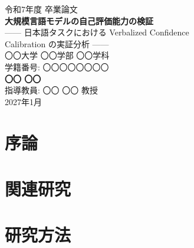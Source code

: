 \documentclass[12pt,a4paper,titlepage]{ltjsarticle}
\begin{document}
\begin{titlepage}
  \centering
  \vspace*{3cm}

  {\LARGE 令和7年度 卒業論文}\\[2cm]

  {\Huge\bfseries 大規模言語モデルの自己評価能力の検証}\\[0.8cm]
  {\Large —— 日本語タスクにおける Verbalized Confidence\\
  Calibration の実証分析 ——}\\[3cm]

  {\Large 〇〇大学 〇〇学部 〇〇学科}\\[0.5cm]
  {\Large 学籍番号: 〇〇〇〇〇〇〇〇}\\[0.5cm]
  {\Large\bfseries 〇〇 〇〇}\\[2cm]

  {\Large 指導教員: 〇〇 〇〇 教授}\\[1cm]

  {\Large 2027年1月}

  \vfill
\end{titlepage}

\begin{abstract}
本研究は、日本語タスクにおける大規模言語モデル（LLM）の自己評価能力、
すなわち verbalized confidence calibration の品質を体系的に検証した。
（以下、結果が出てから記述）
\end{abstract}

\newpage

\tableofcontents
\newpage



\section{序論}\label{sec:introduction}


\section{関連研究}\label{sec:related-work}


\section{研究方法}\label{sec:methods}

\end{document}
